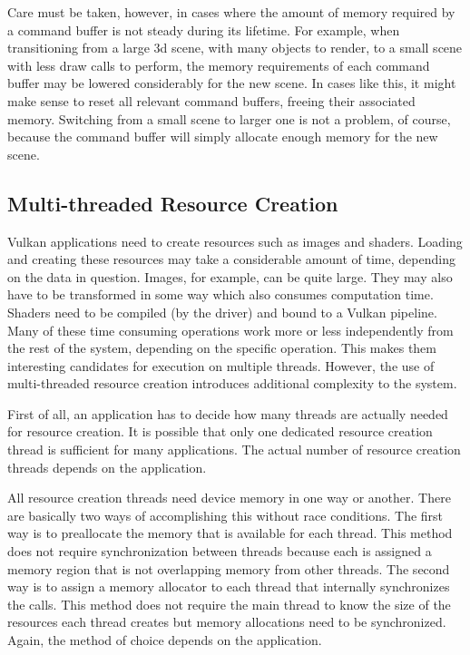         Care must be taken, however, in cases where the amount of memory required by a command buffer is not steady during its lifetime.
        For example, when transitioning from a large \gls{3d} scene, with many objects to render, to a small scene with less draw calls to perform, the memory requirements of each command buffer may be lowered considerably for the new scene.
        In cases like this, it might make sense to reset all relevant command buffers, freeing their associated memory.
        Switching from a small scene to larger one is not a problem, of course, because the command buffer will simply allocate enough memory for the new scene.


    \subsection{Multi-threaded Resource Creation}
      Vulkan applications need to create resources such as images and shaders.
      Loading and creating these resources may take a considerable amount of time, depending on the data in question.
      Images, for example, can be quite large.
      They may also have to be transformed in some way which also consumes computation time.
      Shaders need to be compiled (by the \gls{driver}) and bound to a Vulkan pipeline.
      Many of these time consuming operations work more or less independently from the rest of the system, depending on the specific operation.
      This makes them interesting candidates for execution on multiple threads.
      However, the use of multi-threaded resource creation introduces additional complexity to the system.

      First of all, an application has to decide how many threads are actually needed for resource creation.
      It is possible that only one dedicated resource creation thread is sufficient for many applications.
      The actual number of resource creation threads depends on the application.

      All resource creation threads need device memory in one way or another.
      There are basically two ways of accomplishing this without race conditions.
      The first way is to preallocate the memory that is available for each thread.
      This method does not require synchronization between threads because each is assigned a memory region that is not overlapping memory from other threads.
      The second way is to assign a memory allocator to each thread that internally synchronizes the calls.
      This method does not require the main thread to know the size of the resources each thread creates but memory allocations need to be synchronized.
      Again, the method of choice depends on the application.

